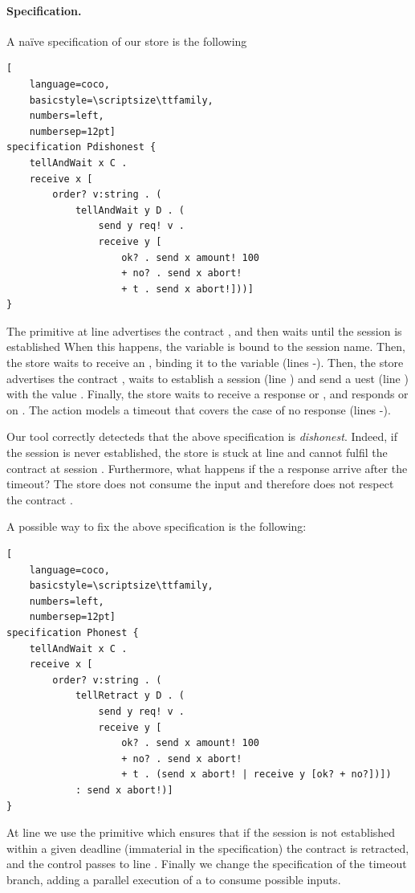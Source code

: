 \paragraph{Specification.}
A naïve \coco specification of our store is the following
\begin{lstlisting}[
    language=coco,
    basicstyle=\scriptsize\ttfamily,
    numbers=left,
    numbersep=12pt]
specification Pdishonest {
    tellAndWait x C .
    receive x [
        order? v:string . (
            tellAndWait y D . (
                send y req! v .
                receive y [
                    ok? . send x amount! 100
                    + no? . send x abort!
                    + t . send x abort!]))]
}
\end{lstlisting}

The primitive  at line 
advertises the contract ,
and then waits until the session is established
When this happens, the variable  is bound to the session name.
Then, the store waits to receive an , 
binding it to the variable  (lines -).
Then, the store advertises the contract , waits to establish a session
 (line ) and send a uest (line ) with
the value .
Finally, the store waits to receive a response  or ,
and responds  or  on . 
The action  models a timeout 
that covers the case of no response (lines -).

Our tool correctly detecteds that the above specification is \emph{dishonest}.
Indeed, if the session 
is never established, 
the store is stuck at line  
and cannot fulfil the contract  at session .
Furthermore, what happens if the a response arrive after the timeout?
The store does not consume the input and 
therefore does not respect the contract .

A possible way to fix the above specification is the following:
\begin{lstlisting}[
    language=coco,
    basicstyle=\scriptsize\ttfamily,
    numbers=left,
    numbersep=12pt]
specification Phonest {
    tellAndWait x C .
    receive x [
        order? v:string . (
            tellRetract y D . (
                send y req! v .
                receive y [
                    ok? . send x amount! 100
                    + no? . send x abort!
                    + t . (send x abort! | receive y [ok? + no?])]) 
            : send x abort!)]
}
\end{lstlisting}
At line  we use the primitive 
which ensures that if the session  is not established
within a given deadline (immaterial in the specification)
the contract  is retracted,
and the control passes to line .
Finally we change the specification of the timeout branch,
adding a parallel execution of a 
to consume possible inputs.


